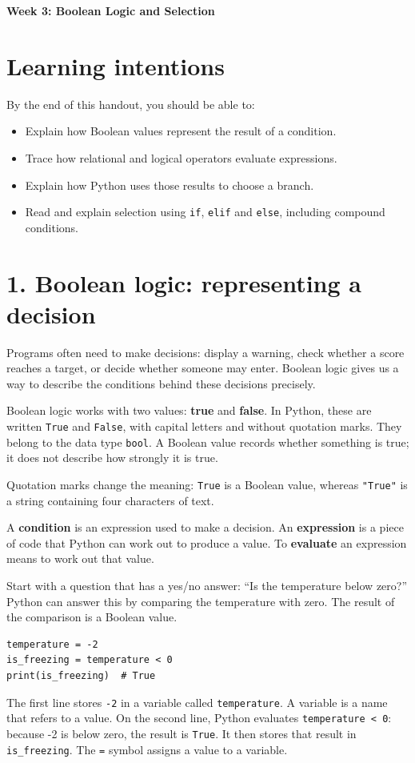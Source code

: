 \documentclass[12pt,a4paper]{article}
\begin{document}
{\LARGE\bfseries\color{accent} Week 3: Boolean Logic and Selection\par}\medskip
{}\section*{Learning intentions}
By the end of this handout, you should be able to:

\begin{itemize}
\item Explain how Boolean values represent the result of a condition.
\item Trace how relational and logical operators evaluate expressions.
\item Explain how Python uses those results to choose a branch.
\item Read and explain selection using \texttt{if}, \texttt{elif} and \texttt{else}, including compound conditions.
\end{itemize}
\section*{1. Boolean logic: representing a decision}
Programs often need to make decisions: display a warning, check whether a score reaches a target, or decide whether someone may enter. Boolean logic gives us a way to describe the conditions behind these decisions precisely.

Boolean logic works with two values: \textbf{true} and \textbf{false}. In Python, these are written \texttt{True} and \texttt{False}, with capital letters and without quotation marks. They belong to the data type \texttt{bool}. A Boolean value records whether something is true; it does not describe how strongly it is true.

Quotation marks change the meaning: \texttt{True} is a Boolean value, whereas \texttt{"True"} is a string containing four characters of text.

A \textbf{condition} is an expression used to make a decision. An \textbf{expression} is a piece of code that Python can work out to produce a value. To \textbf{evaluate} an expression means to work out that value.

Start with a question that has a yes/no answer: “Is the temperature below zero?” Python can answer this by comparing the temperature with zero. The result of the comparison is a Boolean value.

\begin{minipage}{\linewidth}
\begin{lstlisting}
temperature = -2
is_freezing = temperature < 0
print(is_freezing)  # True
\end{lstlisting}
\end{minipage}
\par
The first line stores \texttt{-2} in a variable called \texttt{temperature}. A variable is a name that refers to a value. On the second line, Python evaluates \texttt{temperature < 0}: because -2 is below zero, the result is \texttt{True}. It then stores that result in \texttt{is\_freezing}. The \texttt{=} symbol assigns a value to a variable.
\end{document}
